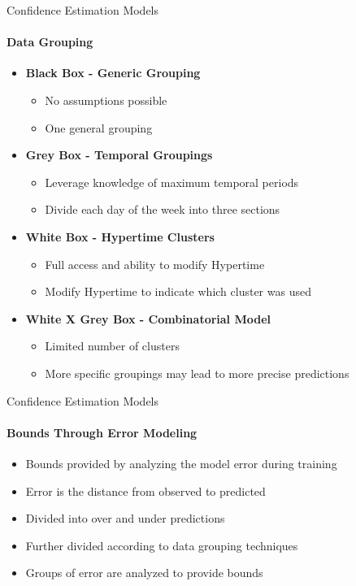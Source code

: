 \documentclass{beamer}
\begin{document}
\begin{frame}[t]{Confidence Estimation Models}
  \framesubtitle{Data Grouping}
  \begin{itemize}
    \setlength\itemsep{1em}
  \item \textbf{Black Box - Generic Grouping}
      \begin{itemize}
        \item No assumptions possible
        \item One general grouping
      \end{itemize}

    \item \textbf{Grey Box - Temporal Groupings}
      \begin{itemize}
        \item Leverage knowledge of maximum temporal periods
        \item Divide each day of the week into three sections
      \end{itemize}

    \item \textbf{White Box - Hypertime Clusters}
      \begin{itemize}
        \item Full access and ability to modify Hypertime
        \item Modify Hypertime to indicate which cluster was used
      \end{itemize}

    \item \textbf{White X Grey Box - Combinatorial Model}
      \begin{itemize}
        \item Limited number of clusters
        \item More specific groupings may lead to more precise predictions
      \end{itemize}

  \end{itemize}
\end{frame}




\begin{frame}[t]{Confidence Estimation Models}
  \framesubtitle{Bounds Through Error Modeling }
  \begin{itemize}

      \setlength\itemsep{1em}
      \item Bounds provided by analyzing the model error during training
      \item Error is the distance from observed to predicted
      \item Divided into over and under predictions
      \item Further divided according to data grouping techniques
      \item Groups of error are analyzed to provide bounds

  \end{itemize}
\end{frame}
\end{document}
